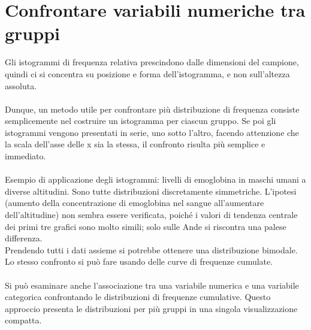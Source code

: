 \documentclass[drafts, 10pt]{book}
\begin{document}
\section{Confrontare variabili numeriche tra gruppi}
Gli istogrammi di frequenza relativa prescindono dalle dimensioni del campione, quindi ci si concentra su posizione e forma dell’istogramma, e non sull’altezza assoluta.
\\
\\
Dunque, un metodo utile per confrontare più distribuzione di frequenza consiste semplicemente nel costruire un istogramma per ciascun gruppo. Se poi gli istogrammi vengono presentati in serie, uno sotto l'altro, facendo attenzione che la scala dell'asse delle x sia la stessa, il confronto risulta più semplice e immediato.
\\
\\
Esempio di applicazione degli istogrammi: livelli di emoglobina in maschi umani a diverse altitudini.
Sono tutte distribuzioni discretamente simmetriche. L’ipotesi (aumento della concentrazione di emoglobina nel sangue all’aumentare dell’altitudine) non sembra essere verificata, poiché i valori di tendenza centrale dei primi tre grafici sono molto simili; solo sulle Ande si riscontra una palese differenza.
\\
Prendendo tutti i dati assieme si potrebbe ottenere una distribuzione bimodale.
\\
Lo stesso confronto si può fare usando delle curve di frequenze cumulate.
\\
\\
Si può esaminare anche l'associazione tra una variabile numerica e una variabile categorica confrontando le distribuzioni di frequenze cumulative. Questo approccio presenta le distribuzioni per più gruppi in una singola visualizzazione compatta.
\end{document}
